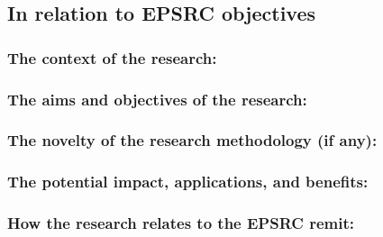 \documentclass{article}
\begin{document}
\subsection{In relation to EPSRC objectives}

\subsubsection{The context of the research:}

\subsubsection{The aims and objectives of the research:}
 
\subsubsection{The novelty of the research methodology (if any):}
 
\subsubsection{The potential impact, applications, and benefits:}
 
\subsubsection{How the research relates to the EPSRC remit:}
\end{document}
